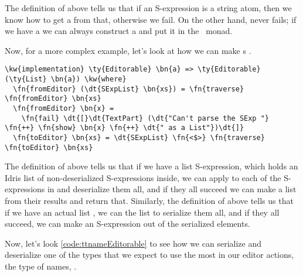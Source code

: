 The definition of  above tells us that if an S-expression is a
string atom, then we know how to get a  from that, otherwise we
fail.  On the other hand,  never fails; if we have a 
we can always construct a  and put it in the \Elab\ monad.

Now, for a more complex example, let's look at how we can make s .

\begin{Verbatim}[framesep=2mm, label=\footnotesize{\normalfont{Idris}}, labelposition=topline]
\kw{implementation} \ty{Editorable} \bn{a} => \ty{Editorable} (\ty{List} \bn{a}) \kw{where}
  \fn{fromEditor} (\dt{SExpList} \bn{xs}) = \fn{traverse} \fn{fromEditor} \bn{xs}
  \fn{fromEditor} \bn{x} =
    \fn{fail} \dt{[}\dt{TextPart} (\dt{"Can't parse the SExp "} \fn{++} \fn{show} \bn{x} \fn{++} \dt{" as a List"})\dt{]}
  \fn{toEditor} \bn{xs} = \dt{SExpList} \fn{<$>} \fn{traverse} \fn{toEditor} \bn{xs}
\end{Verbatim}

The definition of  above tells us that if we have a list
S-expression, which holds an Idris list  of non-deserialized
S-expressions inside, we can apply  to each of the S-expressions
in  and deserialize them all, and if they all succeed we can make a list
from their results and return that.
Similarly, the definition of  above tells us that if we have an
actual list , we can  the list to serialize them all, and
if they all succeed, we can make an S-expression out of the serialized
elements.

Now, let's look \autoref{code:ttnameEditorable} to see how we can serialize and
deserialize one of the types that we expect to use the most in our editor
actions, the type of names, .


